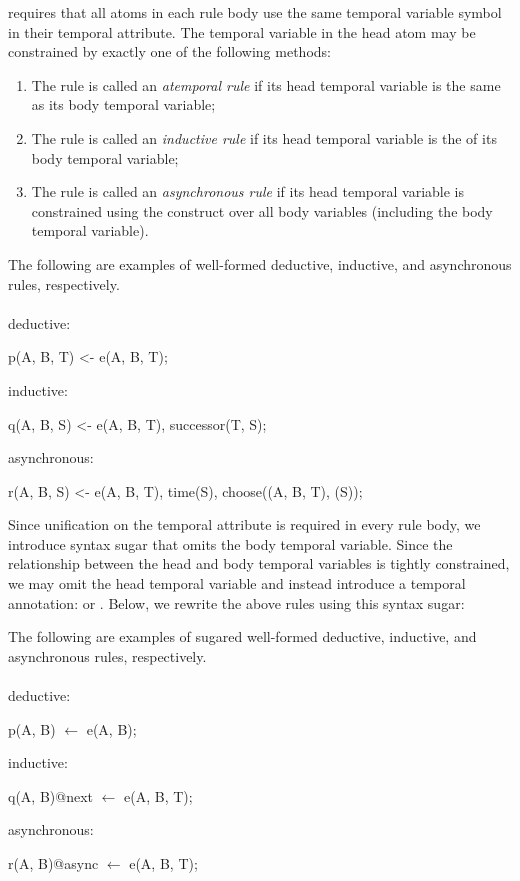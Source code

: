 \lang requires that all atoms in each rule body use the same temporal variable symbol in their temporal attribute.  The temporal variable in the head atom may be constrained by exactly one of the following methods:

\begin{enumerate}
\item The rule is called an {\em atemporal rule} if its head temporal variable is the same as its body temporal variable;
\item The rule is called an {\em inductive rule} if its head temporal variable is the  of its body temporal variable;
\item The rule is called an {\em asynchronous rule} if its head temporal variable is constrained using the  construct over all body variables (including the body temporal variable).
\end{enumerate}

\begin{example}
The following are examples of well-formed deductive, inductive, and asynchronous rules, respectively.
\\\\
deductive:
\begin{Dedalus}
p(A, B, T) <- e(A, B, T);
\end{Dedalus}
inductive:
\begin{Dedalus}
q(A, B, S) <- e(A, B, T), successor(T, S);
\end{Dedalus}
asynchronous:
\begin{Dedalus}
r(A, B, S) <- e(A, B, T), time(S),
              choose((A, B, T), (S));
\end{Dedalus}
\end{example}

Since unification on the temporal attribute is required in every rule body, we introduce syntax sugar that omits the body temporal variable.  Since the relationship between the head and body temporal variables is tightly constrained, we may omit the head temporal variable and instead introduce a temporal annotation:  or .  Below, we rewrite the above rules using this syntax sugar:

\begin{example}
The following are examples of sugared well-formed deductive, inductive, and asynchronous rules, respectively.
\\\\
deductive:
\begin{Dedalus}
p(A, B) \(\leftarrow\) e(A, B);
\end{Dedalus}
inductive:
\begin{Dedalus}
q(A, B)@next \(\leftarrow\) e(A, B, T);
\end{Dedalus}
asynchronous:
\begin{Dedalus}
r(A, B)@async \(\leftarrow\) e(A, B, T);
\end{Dedalus}
\end{example}

